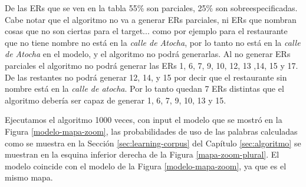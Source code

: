De las ERs que se ven en la tabla 55\% son parciales, 25\% son sobreespecificadas. Cabe notar que el algoritmo no va a generar ERs parciales, ni ERs que nombran cosas que no son ciertas para el target... como por ejemplo para el restaurante que no tiene nombre no est\'a en la {\it calle de Atocha}, por lo tanto no est\'a en la {\it calle de Atocha} en el modelo, y el algoritmo no podr\'a generarlas. Al no generar ERs parciales el algoritmo no podr\'a generar las ERs 1, 6, 7, 9, 10, 12, 13 ,14, 15 y 17. De las restantes no podr\'a generar 12, 14, y 15 por decir que el restaurante sin nombre est\'a en la {\it calle de atocha}. Por lo tanto quedan 7 ERs distintas que el algoritmo deber\'ia ser capaz de generar 1, 6, 7, 9, 10, 13 y 15. %

Ejecutamos el algoritmo 1000 veces, con input el modelo que se mostr\'o en la Figura \ref{modelo-mapa-zoom}, las probabilidades de uso de las palabras calculadas como se muestra en la Secci\'on \ref{sec:learning-corpus} del Cap\'itulo \ref{sec:algoritmo} se muestran en la esquina inferior derecha de la Figura \ref{mapa-zoom-plural}. El modelo coincide con el modelo de la Figura \ref{modelo-mapa-zoom}, ya que es el mismo mapa.


